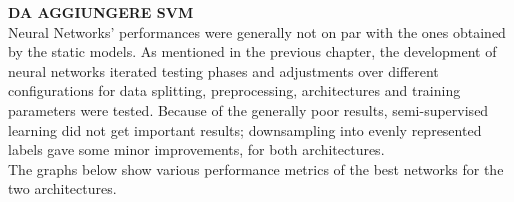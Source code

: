 \textbf{DA AGGIUNGERE SVM}\\

Neural Networks' performances were generally not on par with the ones obtained by
the static models.
As mentioned in the previous chapter, the development of neural networks
iterated testing phases and adjustments over different configurations for data
splitting, preprocessing, architectures and training parameters were tested.
Because of the generally poor results, semi-supervised learning did not get
important results; downsampling into evenly represented labels gave some
minor improvements, for both architectures.\\

The graphs below show various performance metrics of the best networks for the
two architectures.\\


